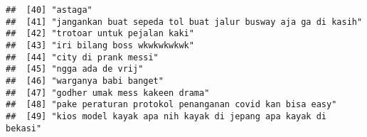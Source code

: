 \documentclass[
]{article}
\begin{document}
\begin{verbatim}
##  [40] "astaga"                                                                                                                                                                                                                                                                            
##  [41] "jangankan buat sepeda tol buat jalur busway aja ga di kasih"                                                                                                                                                                                                                       
##  [42] "trotoar untuk pejalan kaki"                                                                                                                                                                                                                                                        
##  [43] "iri bilang boss wkwkwkwkwk"                                                                                                                                                                                                                                                        
##  [44] "city di prank messi"                                                                                                                                                                                                                                                               
##  [45] "ngga ada de vrij"                                                                                                                                                                                                                                                                  
##  [46] "warganya babi banget"                                                                                                                                                                                                                                                              
##  [47] "godher umak mess kakeen drama"                                                                                                                                                                                                                                                     
##  [48] "pake peraturan protokol penanganan covid kan bisa easy"                                                                                                                                                                                                                            
##  [49] "kios model kayak apa nih kayak di jepang apa kayak di bekasi"                                                                                                                                                                                                                      

\end{verbatim}
\end{document}

